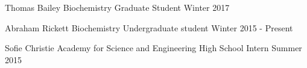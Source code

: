 
\begin{cvmentoring}

  \cvmentor
    {Thomas Bailey} %
    {Biochemistry Graduate Student} %
    {Winter 2017} %

  \cvmentor
    {Abraham Rickett} %
    {Biochemistry Undergraduate student} %
    {Winter 2015 - Present} %

  \cvmentor
    {Sofie Christie} %
    {Academy for Science and Engineering High School Intern} %
    {Summer 2015} %

\end{cvmentoring}

